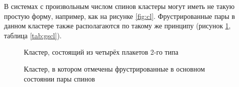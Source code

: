 \documentclass[utf8, babel, sor, jor, amsmath, amssymb, reprint]{elsarticle} %
\begin{document}
В системах с произвольным числом спинов кластеры могут иметь не такую простую форму, например, как на рисунке \ref{fig:cl}. Фрустрированные пары в данном кластере также располагаются по такому же принципу (рисунок \ref{fig:clF}, таблица \ref{tab:gscl}).

\begin{figure}[H]
	\centering
	\begin{minipage}{0.3\textwidth}
		\centering
			\caption{Кластер, состоящий из четырёх плакетов 2-го типа}
		\label{fig:cl}
	\end{minipage}
	\hspace{70pt}
	\begin{minipage}{0.3\textwidth}
		\centering
		\caption{Кластер, в котором отмечены фрустрированные в основном состоянии пары спинов}
		\label{fig:clF}
	\end{minipage}
\end{figure}
\end{document}
